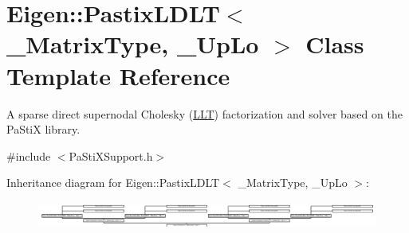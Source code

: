 \hypertarget{class_eigen_1_1_pastix_l_d_l_t}{}\section{Eigen\+:\+:Pastix\+L\+D\+LT$<$ \+\_\+\+Matrix\+Type, \+\_\+\+Up\+Lo $>$ Class Template Reference}
\label{class_eigen_1_1_pastix_l_d_l_t}


A sparse direct supernodal Cholesky (\hyperlink{group___cholesky___module_class_eigen_1_1_l_l_t}{L\+LT}) factorization and solver based on the Pa\+StiX library.  




{\ttfamily \#include $<$Pa\+Sti\+X\+Support.\+h$>$}

Inheritance diagram for Eigen\+:\+:Pastix\+L\+D\+LT$<$ \+\_\+\+Matrix\+Type, \+\_\+\+Up\+Lo $>$\+:\begin{figure}[H]
\begin{center}
\leavevmode
\includegraphics[height=0.899743cm]{class_eigen_1_1_pastix_l_d_l_t}
\end{center}
\end{figure}
